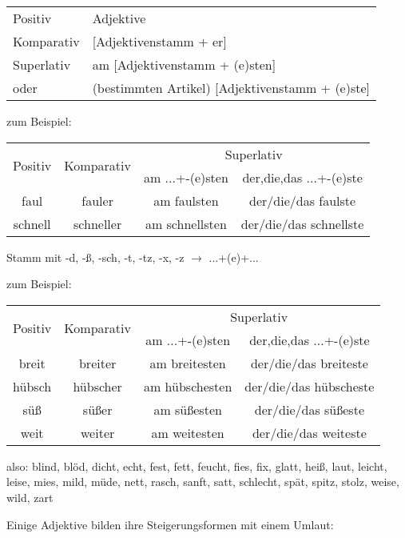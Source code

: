 

\begin{tabular}{ll}
Positiv & Adjektive \\
Komparativ & [Adjektivenstamm + er] \\
Superlativ & am [Adjektivenstamm + (e)sten] \\
oder & (bestimmten Artikel) [Adjektivenstamm + (e)ste]
\end{tabular}

zum Beispiel:

\begin{tabular}{|c|c|c|c|}
\hline
\multirow{2}{*}{Positiv} & \multirow{2}{*}{Komparativ} & \multicolumn{2}{c}{Superlativ} \\ \cline{3-4}
 &  & am ...+-(e)sten & der,die,das ...+-(e)ste \\
\hline
faul & fauler & am faulsten & der/die/das faulste \\
schnell & schneller & am schnellsten & der/die/das schnellste \\
\hline
\end{tabular}

Stamm mit -d, -\ss, -sch, -t, -tz, -x, -z $\rightarrow$ ...+(e)+...

zum Beispiel:

\begin{tabular}{|c|c|c|c|}
\hline
\multirow{2}{*}{Positiv} & \multirow{2}{*}{Komparativ} & \multicolumn{2}{c}{Superlativ} \\ \cline{3-4}
 &  & am ...+-(e)sten & der,die,das ...+-(e)ste \\
\hline
breit & breiter & am breitesten & der/die/das breiteste \\
h\"ubsch & h\"ubscher & am h\"ubschesten & der/die/das h\"ubscheste \\
s\"u\ss & s\"u\ss er & am s\"u\ss esten & der/die/das s\"u\ss este \\
weit & weiter & am weitesten & der/die/das weiteste \\
\hline
\end{tabular}

also: blind, bl\"od, dicht, echt, fest, fett, feucht, fies, fix, glatt, hei\ss, laut, leicht, leise, mies, mild, m\"ude, nett, rasch, sanft, satt, schlecht, sp\"at, spitz, stolz, weise, wild, zart

Einige Adjektive bilden ihre Steigerungsformen mit einem Umlaut:

